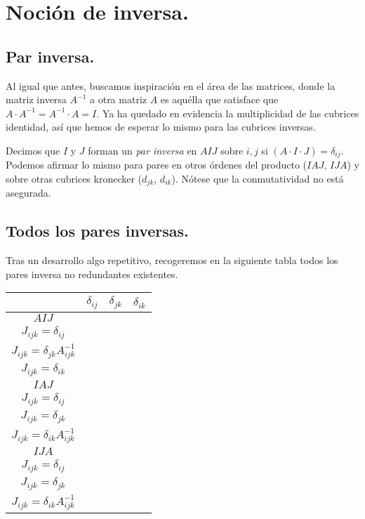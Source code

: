 \section{Noción de inversa.}

\subsection{Par inversa.}

Al igual que antes, buscamos inspiración en el área de las matrices, donde la matriz inversa $A^{-1}$ a otra matriz $A$ es aquélla que satisface que ${A\cdot A^{-1} = A^{-1} \cdot A = I}$. Ya ha quedado en evidencia la multiplicidad de las cubrices identidad, así que hemos de esperar lo mismo para las cubrices inversas.

Decimos que $I$ y $J$ forman un \textit{par inversa} en $AIJ$ sobre $i, j$ si $(A\cdot I \cdot J) = \delta_{ij}$. Podemos afirmar lo mismo para pares en otros órdenes del producto ($IAJ$, $IJA$) y sobre otras cubrices kronecker ($d_{jk}$, $d_{ik}$). Nótese que la conmutatividad no está asegurada.

\subsection{Todos los pares inversas.}

Tras un desarrollo algo repetitivo, recogeremos en la siguiente tabla todos los pares inversa no redundantes existentes.

\vspace{0.5cm}

\begin{tabular}{ |c|c|c|c| } 
	\hline
		  & $\delta_{ij}$      & $\delta_{jk}$       & $\delta_{ik}$ \\
	\hline
	$AIJ$ & \makecell{$I_{ijk} = \delta_{ij} A_{ijk}^{-1}$ \\ $J_{ijk} = \delta_{ij}$}                          & \makecell{$I_{ijk} = \delta_{jk}$ \\ $J_{ijk} = \delta_{jk} A_{ijk}^{-1}$}                          & \makecell{$I_{ijk} = \delta_{ik} \sum\limits^n_{l=1}\delta_{il} A_{lll}^{-1}$ \\ $J_{ijk} = \delta_{ik}$} \\
	\hline
	$IAJ$ & \makecell{$I_{ijk} = \delta_{ij} A_{ijk}^{-1}$ \\ $J_{ijk} = \delta_{ij}$}                          & \makecell{$I_{ijk} = \delta_{jk} \sum\limits^n_{l=1} \delta_{jl} A_{lll}^{-1}$ \\ $J_{ijk} = \delta_{jk}$} & \makecell{$I_{ijk} = \delta_{ik}$ \\ $J_{ijk} = \delta_{ik} A_{ijk}^{-1}$} \\
	\hline
	$IJA$ & \makecell{$I_{ijk} = \delta_{ij} \sum\limits^n_{l=1} \delta_{il} A_{lll}^{-1}$ \\ $J_{ijk} = \delta_{ij}$} & \makecell{$I_{ijk} = \delta_{jk} A_{ijk}^{-1}$ \\ $J_{ijk} = \delta_{jk}$}                          & \makecell{$I_{ijk} = \delta_{ik}$ \\ $J_{ijk} = \delta_{ik} A_{ijk}^{-1}$} \\
	\hline
\end{tabular}

